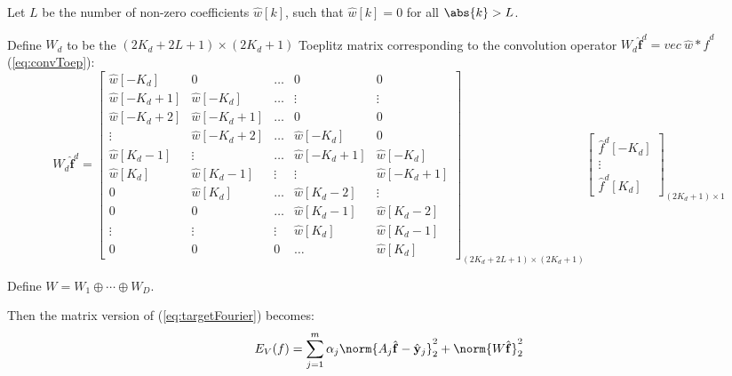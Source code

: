 \documentclass[12pt]{article}
\numberwithin{equation}{section}
\begin{document}
Let $L$ be the number of non-zero coefficients $\hat{w}[k]$, such that  $\hat{w}[k]=0$ for all $\abs{k}>L$. \par
Define $W_d$ to be the $(2K_d+2L+1) \times (2K_d+1)$ Toeplitz matrix corresponding to 
the convolution operator $W_d\hat{\bm{f}}^d=vec \ \hat{w}*\hat{f}^d$ (\ref{eq:convToep}):
\begin{equation} 
	W_d\hat{\bm{f}}^d =
	\begin{bmatrix}
                \hat{w}[-K_d]     & 0 				& \ldots & 0 			& 0 \\
                \hat{w}[-K_d+1] & \hat{w}[-K_d] 		& \ldots & \vdots 		& \vdots \\
                \hat{w}[-K_d+2] & \hat{w}[-K_d+1] 	& \ldots & 0 			& 0 \\
                \vdots 		&  \hat{w}[-K_d+2] 	& \ldots &  \hat{w}[-K_d] 	& 0 \\
                 \hat{w}[K_d-1]  & \vdots 			& \ldots &  \hat{w}[-K_d+1] &  \hat{w}[-K_d] \\
                 \hat{w}[K_d] 	&  \hat{w}[K_d-1] 	& \vdots & \vdots 		&  \hat{w}[-K_d+1] \\
                0 			&  \hat{w}[K_d]		& \ldots &  \hat{w}[K_d-2] 	& \vdots \\
                0 			& 0 				& \ldots &  \hat{w}[K_d-1]	&  \hat{w}[K_d-2] \\
                \vdots 		& \vdots 			& \vdots &  \hat{w}[K_d] 	&  \hat{w}[K_d-1]\\
                0 			& 0 				& 0 	     & \ldots 		& \hat{w}[K_d]
	\end{bmatrix}_{(2K_d+2L+1) \times (2K_d+1)}
	\begin{bmatrix}
		\hat{f}^d[-K_d] \\  \vdots \\ \hat{f}^d[K_d] 
	\end{bmatrix}_{(2K_d+1) \times 1}
\end{equation} \par
Define $W=W_1 \oplus \cdots \oplus W_D$. \par
Then the matrix version of (\ref{eq:targetFourier}) becomes:
\begin{equation} \label{eq:targetMatrix}
	E_V(f)=\sum^{m}_{j=1} \alpha_j \norm{A_j \hat{\mathbf{f}}-\hat{\mathbf{y}}_j}^2_{2}
		 + \norm{W  \hat{\mathbf{f}}}^2_{2}
\end{equation} \par

\end{document}

